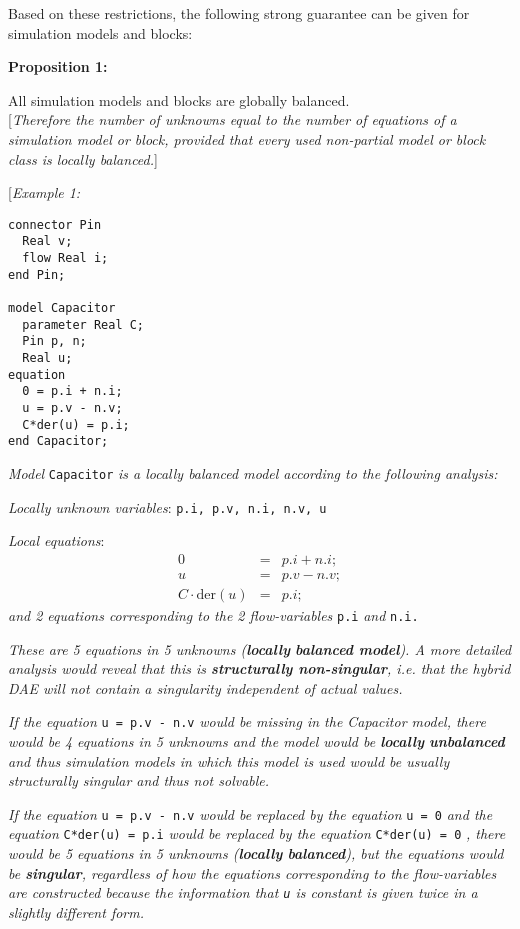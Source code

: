 Based on these restrictions, the following strong guarantee can be given
for simulation models and blocks:

\textbf{Proposition 1:}

All simulation models and blocks are globally balanced.\\
{[}\emph{Therefore the number of unknowns equal to the number of
equations of a simulation model or block, provided that every used
non-partial model or block class is locally balanced.}{]}

{[}\emph{Example 1:}
\begin{lstlisting}[language=modelica]
connector Pin
  Real v;
  flow Real i;
end Pin;

model Capacitor
  parameter Real C;
  Pin p, n;
  Real u;
equation
  0 = p.i + n.i;
  u = p.v - n.v;
  C*der(u) = p.i;
end Capacitor;
\end{lstlisting}

\emph{Model} \lstinline!Capacitor! \emph{is a locally balanced model according to
the following analysis:}

\emph{Locally unknown variables}: \lstinline!p.i, p.v, n.i, n.v, u!

\emph{Local equations}:
\begin{eqnarray*}
0 &=& p.i + n.i;\\
u &=& p.v - n.v;\\
C \cdot \text{der}(u) &=& p.i;
\end{eqnarray*}
\emph{and 2 equations corresponding to the 2 flow-variables} \lstinline!p.i!
\emph{and} \lstinline!n.i.!

\emph{These are 5 equations in 5 unknowns (\textbf{locally}
\textbf{balanced model}). A more detailed analysis would reveal that
this is \textbf{structurally non-singular}, i.e. that the hybrid DAE
will not contain a singularity independent of actual values.}

\emph{If the equation} \lstinline!u = p.v - n.v! \emph{would be missing in the
Capacitor model, there would be 4 equations in 5 unknowns and the model
would be \textbf{locally} \textbf{unbalanced} and thus simulation models
in which this model is used would be usually structurally singular and
thus not solvable.}

\emph{If the equation} \lstinline!u = p.v - n.v! \emph{would be replaced by the
equation} \lstinline!u = 0! \emph{and the equation} \lstinline!C*der(u) = p.i! \emph{would
be replaced by the equation} \lstinline!C*der(u) = 0! \emph{, there would be 5
equations in 5 unknowns (\textbf{locally} \textbf{balanced}), but the
equations would be \textbf{singular}, regardless of how the equations
corresponding to the flow-variables are constructed because the
information that \lstinline!u! is constant is given twice in a slightly
different form.}

